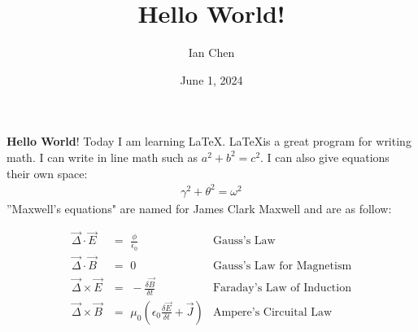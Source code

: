 \documentclass{article}
\title{Hello World!}
\author{Ian Chen}
\date{June 1, 2024}
\begin{document}
\maketitle

\textbf{Hello World}! Today I am learning \LaTeX. \LaTeX is a great program for writing math. I can write in line math such as $a^2+b^2=c^2$. I can also give equations their own space:
\begin{align}
    \gamma^2+\theta^2=\omega^2
\end{align}
''Maxwell's equations" are named for James Clark Maxwell and are as follow:

\begin{align}
\Vec{\Delta} \cdot \Vec{E} &= \,\,\frac{\phi}{\epsilon_0}  &\text{Gauss's Law}\\
\Vec{\Delta} \cdot \Vec{B} &= \,\,0 &\text{Gauss's Law for Magnetism}\\
\Vec{\Delta} \times \Vec{E} &= \,\,-\frac{\delta \Vec{B}}{\delta t} &\text{Faraday's Law of Induction}\\
\Vec{\Delta} \times \Vec{B} &= \,\,\mu_0 \left(\epsilon_0 \frac{\delta \Vec{E}}{\delta t} + \Vec{J}\right) &\text{Ampere's Circuital Law}
\end{align}
\end{document}
